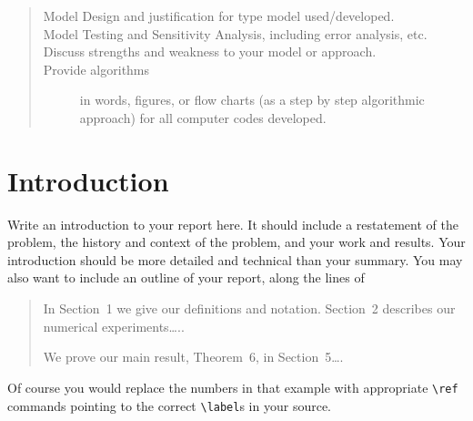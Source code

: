 \documentclass{icmmcm}
\begin{document}
\begin{summary}
\begin{quotation}
\begin{description}
\item[Model Design and justification for type model used/developed.]

\item[Model Testing and Sensitivity Analysis, including error
  analysis, etc.]

\item[Discuss strengths and weakness to your model or approach.]

\item[Provide algorithms] in words, figures, or flow charts (as a step
  by step algorithmic approach) for all computer codes developed.
\end{description}
 \citep{comap-mcm-rules}
\end{quotation}

\end{summary}
 


\maketitle
\tableofcontents

 

\section{Introduction}%
\label{sec:introduction}

Write an introduction to your report here. It should include a
restatement of the problem, the history and context of the problem,
and your work and results.  Your introduction should be more detailed
and technical than your summary.  You may also want to include an
outline of your report, along the lines of
\begin{quotation}
  In Section~1 we give our definitions and notation. Section~2
  describes our numerical experiments\ldots{}..
  
  We prove our main result, Theorem~6, in Section~5\ldots{}.
\end{quotation}

Of course you would replace the numbers in that example with
appropriate \verb|\ref| commands pointing to the correct
\verb|\label|s in your source.
\end{document}

